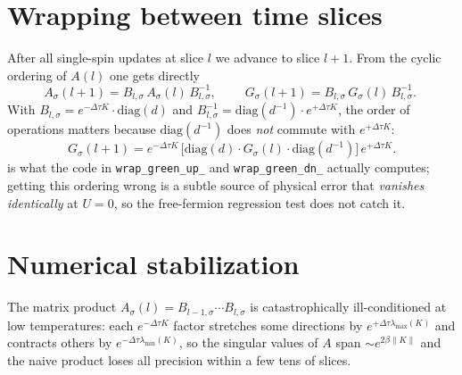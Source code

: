 \documentclass[11pt,a4paper]{article}
\newcommand{\Bm}[2]{B_{#1,#2}}
\newcommand{\dt}{\Delta\tau}
\theoremstyle{plain}
\begin{document}
\section{Wrapping between time slices}

After all single-spin updates at slice \(l\) we advance to slice
\(l+1\). From the cyclic ordering of \(A(l)\) one gets directly
\begin{equation}
A_\sigma(l+1) = \Bm{l}{\sigma} \, A_\sigma(l) \, \Bm{l}{\sigma}^{-1},
\qquad
\boxed{\;
G_\sigma(l+1) = \Bm{l}{\sigma} \, G_\sigma(l) \, \Bm{l}{\sigma}^{-1}.
\;}
\label{eq:wrap}
\end{equation}
With \(\Bm{l}{\sigma} = e^{-\dt K} \cdot \mathrm{diag}(d)\) and
\(\Bm{l}{\sigma}^{-1} = \mathrm{diag}(d^{-1}) \cdot e^{+\dt K}\),
the order of operations matters because \(\mathrm{diag}(d^{-1})\) does
\emph{not} commute with \(e^{+\dt K}\):
\begin{equation}
G_\sigma(l+1)
  = e^{-\dt K} \,
    \bigl[\mathrm{diag}(d) \cdot G_\sigma(l) \cdot \mathrm{diag}(d^{-1})\bigr]
    \, e^{+\dt K} .
\label{eq:wrap-impl}
\end{equation}
 is what the code in \texttt{wrap\_green\_up\_} and
\texttt{wrap\_green\_dn\_} actually computes; getting this ordering
wrong is a subtle source of physical error that \emph{vanishes
identically} at \(U=0\), so the free-fermion regression test does not
catch it.

\section{Numerical stabilization}

The matrix product
\(A_\sigma(l) = \Bm{l-1}{\sigma}\cdots\Bm{l}{\sigma}\) is catastrophically
ill-conditioned at low temperatures: each \(e^{-\dt K}\) factor stretches
some directions by \(e^{+\dt \lambda_{\max}(K)}\) and contracts others by
\(e^{-\dt \lambda_{\min}(K)}\), so the singular values of \(A\) span
\(\sim e^{2\beta\lVert K\rVert}\) and the naive product loses all precision
within a few tens of slices.
\end{document}
